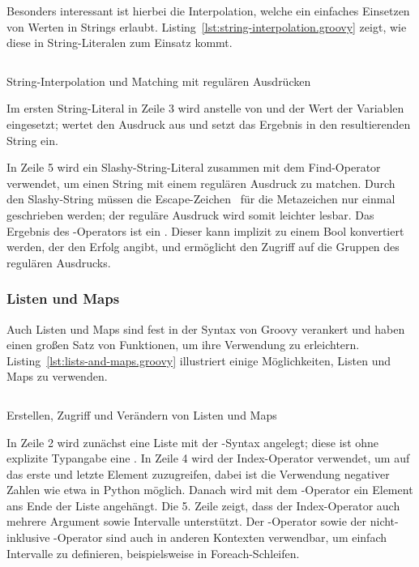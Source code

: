 \documentclass[a4paper]{article}
\newcommand{\codelisting}[3]{
\begin{listing}[ht]
	\inputminted{#1}{#1/#2}
	\vspace{-3ex}
	\caption{#3}
	\label{lst:#2}
\end{listing}
}
\begin{document}
Besonders interessant ist hierbei die Interpolation, welche ein einfaches Einsetzen von Werten in Strings erlaubt.
Listing~\ref{lst:string-interpolation.groovy} zeigt, wie diese in String-Literalen zum Einsatz kommt.

\codelisting{groovy}{string-interpolation.groovy}{String-Interpolation und Matching mit regulären Ausdrücken}

Im ersten String-Literal in Zeile 3 wird anstelle von  und  der Wert der Variablen eingesetzt;
 wertet den Ausdruck  aus und setzt das Ergebnis in den resultierenden String ein.

In Zeile 5 wird ein Slashy-String-Literal zusammen mit dem Find-Operator \code{=~} verwendet, um einen String mit einem regulären Ausdruck zu matchen.
Durch den Slashy-String müssen die Escape-Zeichen~\plain{\ } für die Metazeichen nur einmal geschrieben werden; der reguläre Ausdruck wird somit leichter lesbar.
Das Ergebnis des \code{=~}-Operators ist ein .
Dieser kann implizit zu einem Bool konvertiert werden, der den Erfolg angibt, und ermöglicht den Zugriff auf die Gruppen des regulären Ausdrucks.

\subsubsection{Listen und Maps}\label{subsubsec:listen-und-maps}

Auch Listen und Maps sind fest in der Syntax von Groovy verankert und haben einen großen Satz von Funktionen, um ihre Verwendung zu erleichtern.
Listing~\ref{lst:lists-and-maps.groovy} illustriert einige Möglichkeiten, Listen und Maps zu verwenden.

\codelisting{groovy}{lists-and-maps.groovy}{Erstellen, Zugriff und Verändern von Listen und Maps}

In Zeile 2 wird zunächst eine Liste mit der \code{[]}-Syntax angelegt;
diese ist ohne explizite Typangabe eine .
In Zeile 4 wird der Index-Operator verwendet, um auf das erste und letzte Element zuzugreifen, dabei ist die Verwendung negativer Zahlen wie etwa in Python möglich.
Danach wird mit dem \code{<<}-Operator ein Element ans Ende der Liste angehängt.
Die 5. Zeile zeigt, dass der Index-Operator auch mehrere Argument sowie Intervalle unterstützt.
Der -Operator sowie der nicht-inklusive -Operator sind auch in anderen Kontexten verwendbar, um einfach Intervalle zu definieren, beispielsweise in Foreach-Schleifen.
\end{document}
